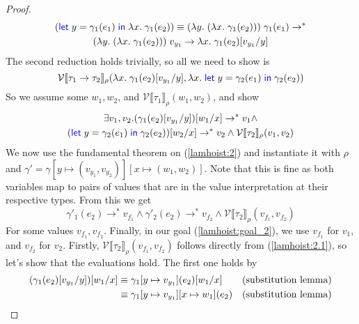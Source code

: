 \documentclass[twoside,11pt,openright]{report}
\theoremstyle{definition}
\newcommand{\var}{x}
\newcommand{\varB}{y}
\newcommand{\expr}{e}
\newcommand{\val}{v}
\newcommand{\valB}{w}
\newcommand{\subst}[3]{#1{\left[#3 \middle/ #2 \right]}}
\newcommand{\Tfunc}[2]{#1 \rightarrow #2}
\newcommand{\typ}{\tau}
\newcommand{\step}{\rightarrow}
\newcommand{\stepS}{\rightarrow^*}
\newcommand{\ValInp}[2]{\mathcal{V} \llbracket #1 \rrbracket_{#2}}
\newcommand{\map}[2]{#1 \mapsto #2}
\begin{document}
\begin{proof}
  \begin{multline*}
    (\Let \varB = \gamma_1(\expr_1) in \fun \var . \gamma_1(\expr_2)) \equiv (\fun \varB . (\fun \var . \gamma_1(\expr_2))) \; \gamma_1(\expr_1) \stepS\\ (\fun \varB . (\fun \var . \gamma_1(\expr_2))) \; \val_{y_1} \step \fun \var . \subst{\gamma_1(\expr_2)}{\varB}{\val_{y_1}}
  \end{multline*}
  The second reduction holds trivially, so all we need to show is 
  \begin{equation}
    \ValInp{\Tfunc{\typ_1}{\typ_2}}{\rho}(\fun \var . \subst{\gamma_1(\expr_2)}{\varB}{\val_{y_1}}, \fun \var . \Let \varB = \gamma_2(\expr_1) in \gamma_2(\expr_2))
  \end{equation}
  So we assume some $\valB_1, \valB_2$, and $\ValInp{\typ_1}{\rho}(\valB_1, \valB_2)$, and show 
  \begin{multline}\label{lamhoist:goal_2}
    \exists \val_1, \val_2 . \subst{(\subst{\gamma_1(\expr_2)}{\varB}{\val_{y_1}})}{\var}{\valB_1} \stepS \val_1 \land\\
    \subst{(\Let \varB = \gamma_2(\expr_1) in \gamma_2(\expr_2))}{\var}{\valB_2} \stepS \val_2 \land
    \ValInp{\typ_2}{\rho}(\val_1, \val_2)
  \end{multline}
  We now use the fundamental theorem on (\ref{lamhoist:2}) and instantiate it with $\rho$ and $\gamma' = \gamma[\map{\varB}{(\val_{y_1}, \val_{y_2})}][\map{\var}{(\valB_1, \valB_2)}]$. Note that this is fine as both variables map to pairs of values that are in the value interpretation at their respective types. From this we get
  \begin{equation}\label{lamhoist:2.1}
    \gamma'_1(\expr_2) \stepS \val_{f_1} \land \gamma'_2(\expr_2) \stepS \val_{f_2} \land \ValInp{\typ_2}{\rho}(\val_{f_1}, \val_{f_2})
  \end{equation}
  For some values $\val_{f_1}, \val_{f_2}$.
  Finally, in our goal (\ref{lamhoist:goal_2}), we use $\val_{f_1}$ for $\val_1$, and $\val_{f_2}$ for $\val_2$. Firstly, $\ValInp{\typ_2}{\rho}(\val_{f_1}, \val_{f_2})$ follows directly from (\ref{lamhoist:2.1}), so let's show that the evaluations hold. The first one holds by
  \begin{align*}
    \subst{(\subst{\gamma_1(\expr_2)}{\varB}{\val_{y_1}})}{\var}{\valB_1}
    &\equiv
    \subst{\gamma_1[\map{\varB}{\val_{y_1}](\expr_2)}}{\var}{\valB_1} & \text{(substitution lemma)}\\
    &\equiv
    \gamma_1[\map{\varB}{\val_{y_1}}][\map{\var}{\valB_1}](\expr_2) & \text{(substitution lemma)}\\

\end{align*}
\end{proof}
\end{document}
